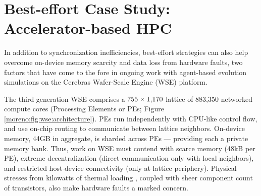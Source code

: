 \vspace{-4.0ex}
\section{Best-effort Case Study: Accelerator-based HPC}
\label{moreno:sec:case2}
\vspace{-2.0ex}



In addition to synchronization inefficiencies, best-effort strategies can also help overcome on-device memory scarcity and data loss from hardware faults, two factors that have come to the fore in ongoing work with agent-based evolution simulations on the Cerebras Wafer-Scale Engine (WSE) platform.

The third generation WSE comprises a $755 \times 1{\small,}170$ lattice of 883{\small,}350 networked compute cores (Processing Elements or PEs; Figure \ref{moreno:fig:wse:architecture}).
PEs run independently with CPU-like control flow, and use on-chip routing to communicate between lattice neighbors. %
On-device memory, 44GB in aggregate, is sharded across PEs --- providing each a private memory bank.
Thus, work on WSE must contend with scarce memory (48kB per PE), extreme decentralization (direct communication only with local neighbors), and restricted host-device connectivity (only at lattice periphery).
Physical stresses from kilowatts of thermal loading \cite{la2020cerebras}, coupled with sheer component count of transistors, also make hardware faults a marked concern.

